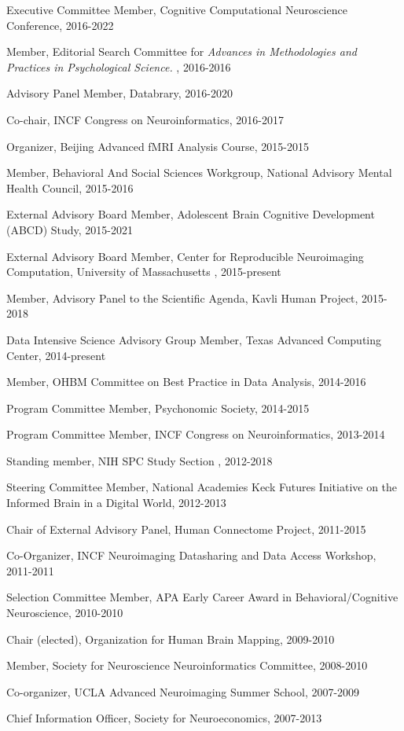 \documentclass[10pt, letterpaper]{article}
\begin{document}
Executive Committee Member, Cognitive Computational Neuroscience Conference, 2016-2022

Member, Editorial Search Committee for \emph{Advances in Methodologies and Practices in Psychological Science.} , 2016-2016

Advisory Panel Member, Databrary, 2016-2020

Co-chair, INCF Congress on Neuroinformatics, 2016-2017

Organizer, Beijing Advanced fMRI Analysis Course, 2015-2015

Member, Behavioral And Social Sciences Workgroup, National Advisory Mental Health Council, 2015-2016

External Advisory Board Member, Adolescent Brain Cognitive Development (ABCD) Study, 2015-2021

External Advisory Board Member, Center for Reproducible Neuroimaging Computation, University of Massachusetts , 2015-present

Member, Advisory Panel to the Scientific Agenda, Kavli Human Project, 2015-2018

Data Intensive Science Advisory Group Member, Texas Advanced Computing Center, 2014-present

Member, OHBM Committee on Best Practice in Data Analysis, 2014-2016

Program Committee Member, Psychonomic Society, 2014-2015

Program Committee Member, INCF Congress on Neuroinformatics, 2013-2014

Standing member, NIH SPC Study Section , 2012-2018

Steering Committee Member, National Academies Keck Futures Initiative on the Informed Brain in a Digital World, 2012-2013

Chair of External Advisory Panel, Human Connectome Project, 2011-2015

Co-Organizer,  INCF Neuroimaging Datasharing and Data Access Workshop, 2011-2011

Selection Committee Member, APA Early Career Award in Behavioral/Cognitive Neuroscience, 2010-2010

Chair (elected), Organization for Human Brain Mapping, 2009-2010

Member, Society for Neuroscience Neuroinformatics Committee, 2008-2010

Co-organizer, UCLA Advanced Neuroimaging Summer School, 2007-2009

Chief Information Officer, Society for Neuroeconomics, 2007-2013
\end{document}
